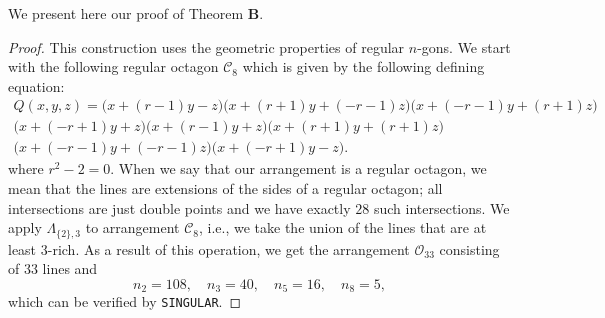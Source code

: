 \documentclass[11pt]{article}
\theoremstyle{plain}
\theoremstyle{definition}
\theoremstyle{plain}
\begin{document}
We present here our proof of Theorem \textbf{B}.
\begin{proof}
This construction uses the geometric properties of regular $n$-gons. We start with the following regular octagon $\mathcal{C}_{8}$ which is given by the following defining equation:
\begin{multline*}
Q(x,y,z) = \bigg(x + (r - 1)y - z\bigg)\bigg(x + (r + 1)y + (-r - 1)z\bigg)\bigg(x + (-r - 1)y + (r + 1)z\bigg) \\
\bigg(x + (-r + 1)y + z\bigg)\bigg(x + (r - 1)y + z\bigg)\bigg(x + (r + 1)y + (r + 1)z\bigg)\\
\bigg(x + (-r - 1)y + (-r - 1)z\bigg) \bigg(x + (-r + 1)y - z\bigg). 
\end{multline*}
where $r^2-2=0$. When we say that our arrangement is a regular octagon, we mean that the lines are extensions of the sides of a regular octagon; all intersections are just double points and we have exactly $28$ such intersections. We apply $\Lambda_{\{2\},3}$ to arrangement $\mathcal{C}_{8}$, i.e., we take the union of the lines that are at least $3$-rich. As a result of this operation, we get the arrangement $\mathcal{O}_{33}$ consisting of $33$ lines and 
$$n_{2} = 108, \quad n_{3} = 40, \quad n_{5} = 16, \quad n_{8}=5,$$
which can be verified by \verb}SINGULAR}. 


\end{proof}
\end{document}
